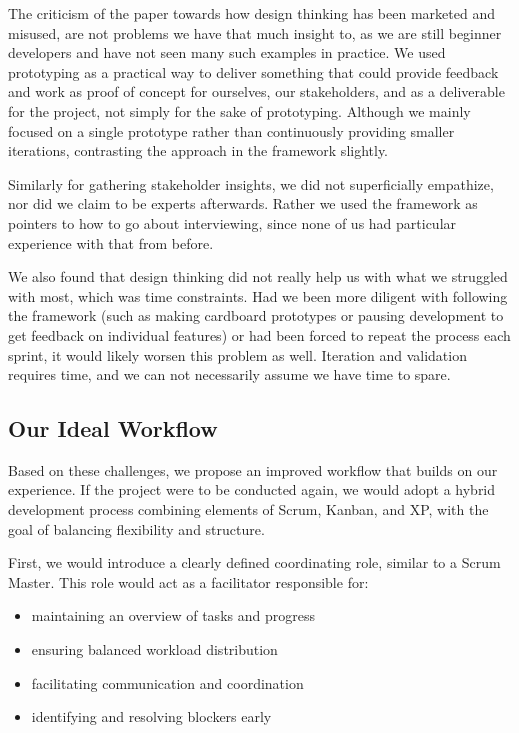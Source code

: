 The criticism of the paper towards how design thinking has been marketed and misused, are not problems we have that much insight to,
as we are still beginner developers and have not seen many such examples in practice.
We used prototyping as a practical way to deliver something that could provide feedback and work as proof of concept for ourselves, our stakeholders,
and as a deliverable for the project, not simply for the sake of prototyping.
Although we mainly focused on a single prototype rather than continuously providing smaller iterations, contrasting the approach in the framework slightly.

Similarly for gathering stakeholder insights, we did not superficially empathize, nor did we claim to be experts afterwards.
Rather we used the framework as pointers to how to go about interviewing, since none of us had particular experience with that from before.

We also found that design thinking did not really help us with what we struggled with most, which was time constraints.
Had we been more diligent with following the framework (such as making cardboard prototypes or pausing development to get feedback on individual features)
or had been forced to repeat the process each sprint, it would likely worsen this problem as well.
Iteration and validation requires time, and we can not necessarily assume we have time to spare.

\subsection{Our Ideal Workflow}

Based on these challenges, we propose an improved workflow that builds on our experience.
If the project were to be conducted again,
we would adopt a hybrid development process combining elements of Scrum, Kanban, and XP,
with the goal of balancing flexibility and structure.

First, we would introduce a clearly defined coordinating role,
similar to a Scrum Master.
This role would act as a facilitator responsible for:
\begin{itemize}
    \item maintaining an overview of tasks and progress
    \item ensuring balanced workload distribution
    \item facilitating communication and coordination
    \item identifying and resolving blockers early
\end{itemize}

